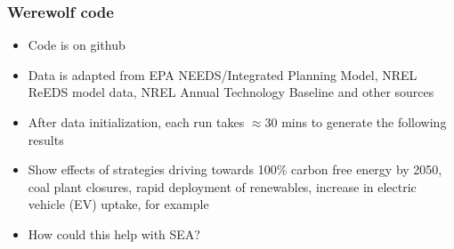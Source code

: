 \documentclass[xcolor=dvipsnames]{beamer}
\newcommand{\exclude}[1]{}
\begin{document}
\begin{frame}
  \frametitle{Werewolf code}

  \begin{itemize}
  \item Code is on github
  \item Data is adapted from EPA NEEDS/Integrated Planning Model, NREL
    ReEDS model data, NREL Annual Technology Baseline and other
    sources
  \item After data initialization, each run takes $\approx 30$ mins to generate
    the following results
  \item Show effects of strategies driving towards 100\% carbon free
    energy by 2050, coal plant closures, rapid deployment of
    renewables, increase in electric vehicle (EV) uptake, for example
  \item How could this help with SEA?
  \end{itemize}

\end{frame}

\exclude{
Thanks for getting all this up and running.   I have reviewed the slides below (pdf and tex attached) and am commenting only on slides 7 - 12.   I think it would be useful to generate some (modified) stories using your new system like:

1) Carbon reductions (with flat imports):   comparison between with and without plant shutdowns  (slide 7 and 9 bottom row).
   I would replace the first figure of the three in each line by some kind of cost figure.

   I also like the slides detailing the spatial distribution of the up or down take.

2) From slide 11, it would be good to do an EV increase in demand.   Maybe some visualization of how that changes demand, and then some figures to tell a story.

3) Rapid deployment of wind and solar resources.   Force the model to do more solar and wind (I don’t really know how much) and find out what gets shut down, operated differently.    I don’t know where the solar or wind should be deployed (maybe this would still be up to the model), but forcing a (percentage?) increase in the amounts of these by 2030 of different amounts would be interesting to see what happens to the other things….

4) Shut down of non-renewable capacity (as opposed to carbon reduction) a la slide 12.   Some idea of how this affects things would be good.

For the appendix, I am wondering if we could do a better job on the data (slide 6).   It might be nice to understand more fully what we have available or how we do the transformations.
}
\end{document}
